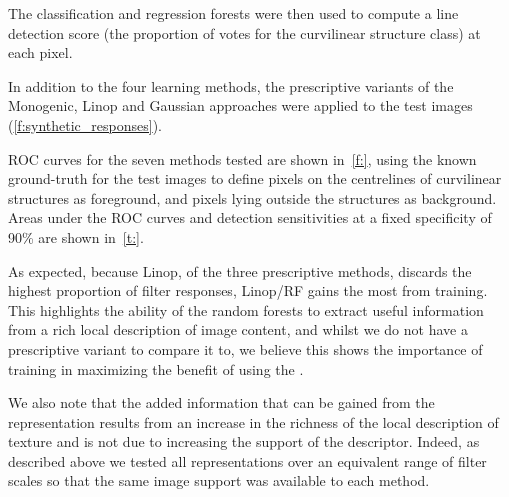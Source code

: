 The classification and regression forests were then used to compute a line detection score (the proportion of votes for the curvilinear structure class) at each pixel. 

In addition to the four learning methods, the prescriptive variants of the Monogenic, Linop and Gaussian approaches were applied to the test images (\ref{f:synthetic_responses}).

ROC curves for the seven methods tested are shown in~\ref{f:}, using the known ground-truth for the test images to define pixels on the centrelines of curvilinear structures as foreground, and pixels lying outside the structures as background. Areas under the ROC curves and detection sensitivities at a fixed specificity of 90\% are shown in~\ref{t:}.

As expected, because Linop, of the three prescriptive methods, discards the highest proportion of filter responses, Linop/RF gains the most from training. This highlights the ability of the random forests to extract useful information from a rich local description of image content, and whilst we do not have a prescriptive variant to compare it to, we believe this shows the importance of training in maximizing the benefit of using the \dtcwt{}. 

We also note that the added information that can be gained from the \dtcwt{} representation results from an increase in the richness of the local description of texture and is not due to increasing the support of the descriptor. Indeed, as described above we tested all representations over an equivalent range of filter scales so that the same image support was available to each method.

%
